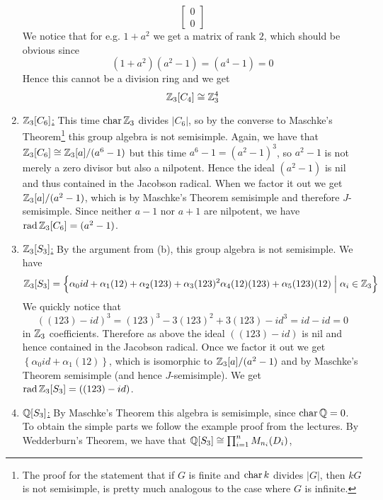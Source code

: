 \documentclass[a4paper, 12pt]{article}
\begin{document}
\begin{Exercise}
\begin{enumerate}[label=(\alph*)]
\[\begin{bmatrix}
                    0 \\
                    0
                \end{bmatrix}
            \]
            We notice that for e.g. $1 + a^2$ we get a matrix of rank $2$, which should be obvious since
            \[
                (1 + a^2)(a^2 - 1) = (a^4 - 1) = 0
            \]
            Hence this cannot be a division ring and we get
            \[
                \mathbb{Z}_3[C_4] \cong \mathbb{Z}_3^4
            \]
        \item \underline{$\mathbb{Z}_3[C_6]$:}
            This time $\operatorname{char}\mathbb{Z}_3$ divides $|C_6|$,
            so by the converse to Maschke's Theorem\footnote{
            The proof for the statement that if $G$ is finite and $\operatorname{char} k$ divides $|G|$, then $kG$ is not semisimple, is pretty much analogous to the case where $G$ is infinite.}
            this group algebra is not semisimple.
            Again, we have that $\mathbb{Z}_3[C_6] \cong \mathbb{Z}_3[a]/(a^6 - 1)$ but this time $a^6 - 1 = (a^2 - 1)^3$, so $a^2 - 1$ is not merely a zero divisor but also a nilpotent.
            Hence the ideal $(a^2 - 1)$ is nil and thus contained in the Jacobson radical.
            When we factor it out we get $\mathbb{Z}_3[a]/(a^2 - 1)$, which is by Maschke's Theorem semisimple and therefore $J$-semisimple.
            Since neither $a - 1$ nor $a + 1$ are nilpotent, we have $\operatorname{rad}\mathbb{Z}_3[C_6] = (a^2 - 1)$.
        \item \underline{$\mathbb{Z}_3[S_3]$:}
            By the argument from (b), this group algebra is not semisimple.
            We have
            \[
                \mathbb{Z}_3[S_3] = \left\{ \alpha_0 id + \alpha_1(12) + \alpha_2(123) + \alpha_3(123)^2 \alpha_4(12)(123) + \alpha_5(123)(12) \; \Big| \; \alpha_i \in \mathbb{Z}_3 \right\}
            \]
            We quickly notice that
            \[
                \left( (123) - id \right)^3 = (123)^3 - 3 (123)^2 + 3(123) - id^3 = id - id = 0
            \]
            in $\mathbb{Z}_3$ coefficients.
            Therefore as above the ideal $((123) - id)$ is nil and hence contained in the Jacobson radical.
            Once we factor it out we get $\left\{\alpha_0 id + \alpha_1 (12) \right\}$, which is isomorphic to $\mathbb{Z}_3[a]/(a^2 - 1)$ and by Maschke's Theorem semisimple (and hence $J$-semisimple).
            We get $\operatorname{rad}\mathbb{Z}_3[S_3] = \left( (123) - id \right)$.
        \item \underline{$\mathbb{Q}[S_3]$:}
            By Maschke's Theorem this algebra is semisimple, since $\operatorname{char}\mathbb{Q} = 0$.
            To obtain the simple parts we follow the example proof from the lectures.
            By Wedderburn's Theorem, we have that $\mathbb{Q}[S_3] \cong \prod_{i = 1}^{n} M_{n_i}(D_i)$,

\end{enumerate}
\end{Exercise}
\end{document}
